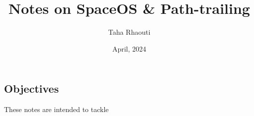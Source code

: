 \documentclass[10pt,a4paper]{article}
\title{Notes on SpaceOS \& Path-trailing}
\author{Taha Rhaouti}
\date{April, 2024}
\begin{document}
\maketitle

\begin{multicols}{2}

    \section*{Objectives}

    These notes are intended to tackle 


\end{multicols} %
\end{document}
